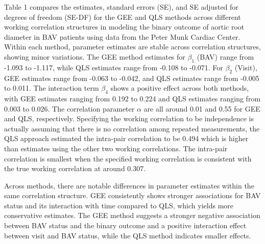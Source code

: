 \documentclass[
]{aft}
\begin{document}
Table 1 compares the estimates, standard errors (SE), and SE adjusted
for degrees of freedom (SE-DF) for the GEE and QLS methods across
different working correlation structures in modeling the binary outcome
of aortic root diameter in BAV patients using data from the Peter Munk
Cardiac Center. Within each method, parameter estimates are stable
across correlation structures, showing minor variations. The GEE method
estimates for \(\beta_1\) (BAV) range from -1.093 to -1.117, while QLS
estimates range from -0.108 to -0.071. For \(\beta_2\) (Visit), GEE
estimates range from -0.063 to -0.042, and QLS estimates range from
-0.005 to 0.011. The interaction term \(\beta_4\) shows a positive
effect across both methods, with GEE estimates ranging from 0.192 to
0.224 and QLS estimates ranging from 0.003 to 0.026. The correlation
parameter \(\alpha\) are all around 0.01 and 0.55 for GEE and QLS,
respectively. Specifying the working correlation to be independence is
actually assuming that there is no correlation among repeated
measurements, the QLS approach estimated the intra-pair correlation to
be 0.494 which is higher than estimates using the other two working
correlations. The intra-pair correlation is smallest when the specified
working correlation is consistent with the true working correlation at
around 0.307.

Across methods, there are notable differences in parameter estimates
within the same correlation structure. GEE consistently shows stronger
associations for BAV status and its interaction with time compared to
QLS, which yields more conservative estimates. The GEE method suggests a
stronger negative association between BAV status and the binary outcome
and a positive interaction effect between visit and BAV status, while
the QLS method indicates smaller effects.
\end{document}
